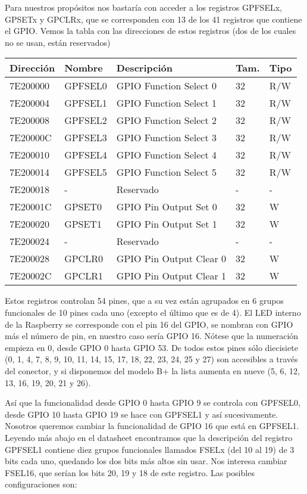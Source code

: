 Para nuestros propósitos nos bastaría con acceder a los registros GPFSELx, GPSETx y GPCLRx,
que se corresponden con 13 de los 41 registros que contiene el GPIO. Vemos la tabla con las
direcciones de estos registros (dos de los cuales no se usan, están reservados)

\begin{longtable}{ p{1.8cm} | p{2cm} | p{5cm} | p{1cm} | p{1cm} }
\hline
{\bf Dirección} & {\bf Nombre} & {\bf Descripción} & {\bf Tam.} & {\bf Tipo} \\ \hline
7E200000 & GPFSEL0 & GPIO Function Select 0 & 32 & R/W \\ \hline
7E200004 & GPFSEL1 & GPIO Function Select 1 & 32 & R/W \\ \hline
7E200008 & GPFSEL2 & GPIO Function Select 2 & 32 & R/W \\ \hline
7E20000C & GPFSEL3 & GPIO Function Select 3 & 32 & R/W \\ \hline
7E200010 & GPFSEL4 & GPIO Function Select 4 & 32 & R/W \\ \hline
7E200014 & GPFSEL5 & GPIO Function Select 5 & 32 & R/W \\ \hline
7E200018 & -       & Reservado              & -  & -   \\ \hline
7E20001C & GPSET0  & GPIO Pin Output Set 0  & 32 & W   \\ \hline
7E200020 & GPSET1  & GPIO Pin Output Set 1  & 32 & W   \\ \hline
7E200024 & -       & Reservado              & -  & -   \\ \hline
7E200028 & GPCLR0  & GPIO Pin Output Clear 0 & 32 & W  \\ \hline
7E20002C & GPCLR1  & GPIO Pin Output Clear 1 & 32 & W  \\ \hline
\end{longtable}

Estos registros controlan 54 pines, que a su vez están agrupados
en 6 grupos funcionales de 10 pines cada uno (excepto el último
que es de 4). El LED interno de la
Raspberry se corresponde con el pin 16 del GPIO, se nombran con
GPIO más el número de pin, en nuestro caso sería GPIO 16. Nótese
que la numeración empieza en 0, desde GPIO 0 hasta GPIO 53. De
todos estos pines sólo diecisiete (0, 1, 4, 7, 8, 9, 10, 11, 14, 15, 17, 18, 22, 23, 24, 25 y 27)
son accesibles a través del conector, y si disponemos del modelo B+ la lista
aumenta en nueve (5, 6, 12, 13, 16, 19, 20, 21 y 26).

Así que la funcionalidad desde GPIO 0 hasta GPIO 9 se controla con
GPFSEL0, desde GPIO 10 hasta GPIO 19 se hace con GPFSEL1 y así
sucesivamente. Nosotros queremos cambiar la funcionalidad de GPIO 16
que está en GPFSEL1. Leyendo más abajo en el datasheet encontramos que
la descripción del registro GPFSEL1 contiene diez grupos funcionales
llamados FSELx (del 10 al 19) de 3 bits cada uno, quedando los dos bits
más altos sin usar. Nos interesa cambiar FSEL16, que serían los bits
20, 19 y 18 de este registro. Las posibles configuraciones son:

